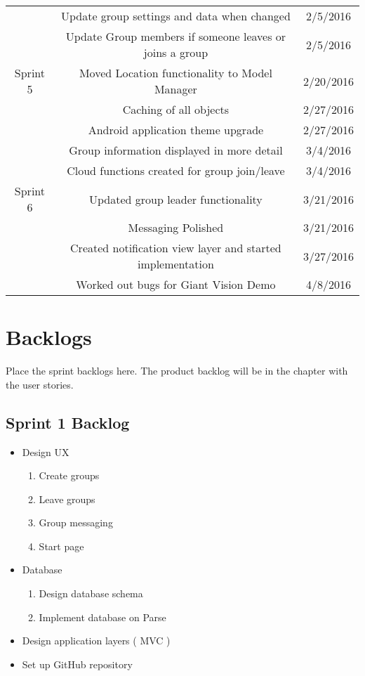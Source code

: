 \begin{center}
\begin{tabular}{c|c|c}
	& Update group settings and data when changed & 2/5/2016 \\
	& Update Group members if someone leaves or joins a group & 2/5/2016 \\
	\hline
	Sprint 5 & Moved Location functionality to Model Manager & 2/20/2016\\
	&Caching of all objects&2/27/2016\\
	&Android application theme upgrade&2/27/2016\\
	&Group information displayed in more detail &3/4/2016\\
	&Cloud functions created for group join/leave&3/4/2016\\
	\hline
	Sprint 6 & Updated group leader functionality & 3/21/2016\\
	& Messaging Polished & 3/21/2016\\
	& Created notification view layer and started implementation & 3/27/2016\\
	& Worked out bugs for Giant Vision Demo & 4/8/2016\\
	\hline
	\end{tabular}
\end{center}

\section{Backlogs}
Place the sprint backlogs here.    The product backlog will be in the chapter with the user 
stories.
\subsection{Sprint 1 Backlog}
	\begin{itemize}
	\item Design UX
		\begin{enumerate}
		\item Create groups
		\item Leave groups
		\item Group messaging
		\item Start page
		\end{enumerate}
	\item Database
		\begin{enumerate}
		\item Design database schema
		\item Implement database on Parse
		\end{enumerate}
	\item Design application layers ( MVC )
	\item Set up GitHub repository
	\end{itemize}
	
